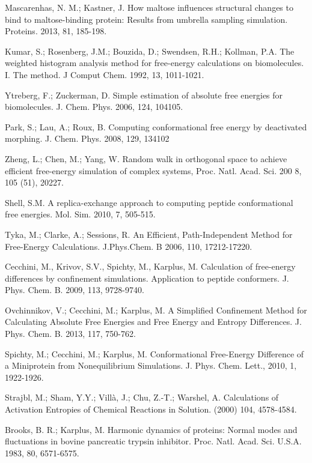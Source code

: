 \documentclass[12pt]{article}
\begin{document}
\begin{thebibliography}{99}
Mascarenhas, N. M.; Kastner, J. How maltose influences structural changes to bind to maltose-binding protein: Results from umbrella sampling simulation. Proteins. 2013, 81, 185-198.

Kumar, S.; Rosenberg, J.M.; Bouzida, D.; Swendsen, R.H.; Kollman, P.A. The weighted histogram analysis method for free-energy calculations on biomolecules. I. The 
method. J Comput Chem. 1992, 13, 1011-1021.

Ytreberg, F.; Zuckerman, D. Simple estimation of absolute free energies for biomolecules. J. Chem. Phys. 2006, 124, 104105.

Park, S.; Lau, A.; Roux, B. Computing conformational free energy by deactivated morphing. J. Chem. Phys. 2008, 129, 134102

Zheng, L.; Chen, M.; Yang, W. Random walk in orthogonal space to achieve efficient free-energy simulation of complex systems, Proc. Natl. Acad. Sci. 200
8, 105 (51), 20227.

Shell, S.M. A replica-exchange approach to computing peptide conformational free energies. Mol. Sim. 2010, 7, 505-515.

Tyka, M.; Clarke, A.; Sessions, R. An Efficient, Path-Independent Method for Free-Energy Calculations. J.Phys.Chem. B 2006, 110, 17212-17220.

Cecchini, M., Krivov, S.V., Spichty, M., Karplus, M. Calculation of free-energy differences by confinement simulations. Application to peptide conformers. J. Phys. Chem. B. 2009, 113, 9728-9740.

Ovchinnikov, V.; Cecchini, M.; Karplus, M. A Simplified Confinement Method for Calculating Absolute Free Energies
and Free Energy and Entropy Differences. J. Phys. Chem. B. 2013, 117, 750-762.

Spichty, M.; Cecchini, M.; Karplus, M. Conformational Free-Energy Difference of a Miniprotein from Nonequilibrium
Simulations. J. Phys. Chem. Lett., 2010, 1, 1922-1926.

Strajbl, M.; Sham, Y.Y.; Villà, J.; Chu, Z.-T.; Warshel, A. Calculations of Activation Entropies of Chemical Reactions
in Solution. (2000) 104, 4578-4584.

Brooks, B. R.; Karplus, M. Harmonic dynamics of proteins: Normal modes and fluctuations in bovine pancreatic trypsin inhibitor. Proc. Natl. Acad. Sci. U.S.A. 1983, 80, 6571-6575. 


\end{thebibliography}
\end{document}
